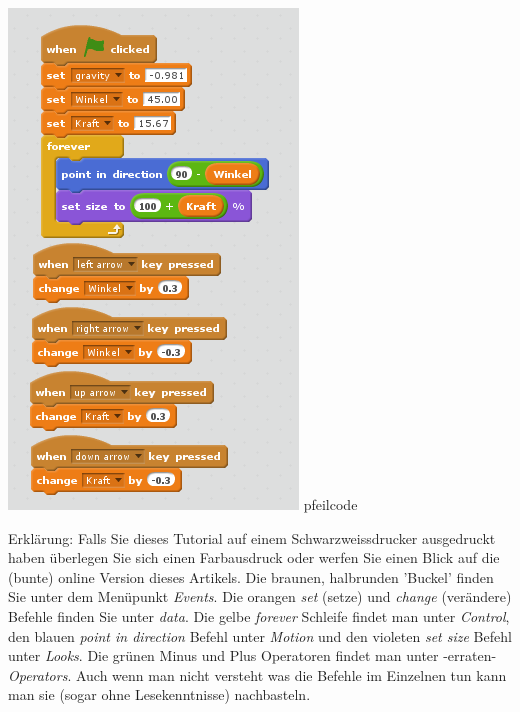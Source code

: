 \documentclass[10pt,a4paper,ngerman,twoside]{article} %
\begin{document}
\begin{multicols}{3}
\begin{center}
\includegraphics[width=\linewidth]{scratch/fpfeilcode.png}
\footnotesize{pfeilcode}
\end{center}

Erklärung: Falls Sie dieses Tutorial auf einem Schwarzweissdrucker ausgedruckt haben überlegen Sie sich einen Farbausdruck oder werfen Sie einen Blick auf die (bunte) online Version dieses Artikels. Die braunen, halbrunden 'Buckel' finden Sie unter dem Menüpunkt \textit{Events}. Die orangen \textit{set} (setze) und \textit{change} (verändere) Befehle finden Sie unter \textit{data}. Die gelbe \textit{forever} Schleife findet man unter \textit{Control}, den blauen \textit{point in direction} Befehl unter \textit{Motion} und den violeten \textit{set size} Befehl unter \textit{Looks}. Die grünen Minus und Plus Operatoren findet man unter -erraten- \textit{Operators}. Auch wenn man nicht versteht was die Befehle im Einzelnen tun kann man sie (sogar ohne Lesekenntnisse) nachbasteln. 


\end{multicols}
\end{document}

